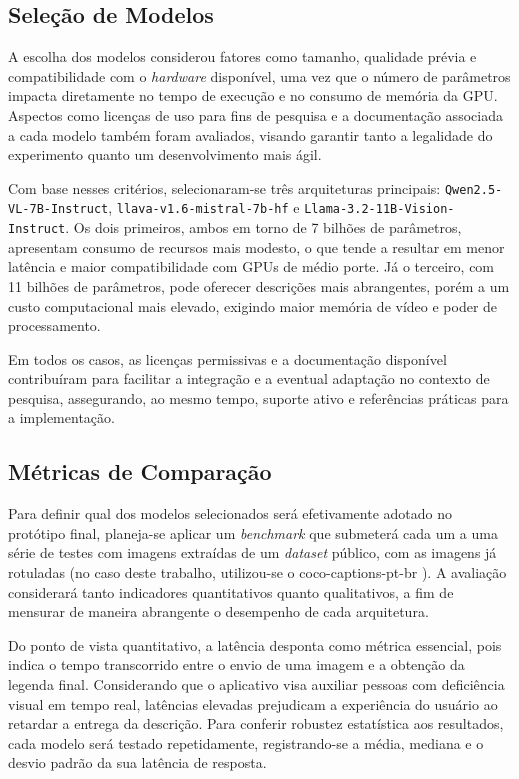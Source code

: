 \subsection{Seleção de Modelos}

A escolha dos modelos considerou fatores como tamanho, qualidade prévia e compatibilidade com o \textit{hardware} disponível, uma vez que o número de parâmetros impacta diretamente no tempo de execução e no consumo de memória da GPU. Aspectos como licenças de uso para fins de pesquisa e a documentação associada a cada modelo também foram avaliados, visando garantir tanto a legalidade do experimento quanto um desenvolvimento mais ágil.

Com base nesses critérios, selecionaram-se três arquiteturas principais: \lstinline{Qwen2.5-VL-7B-Instruct}, \lstinline{llava-v1.6-mistral-7b-hf} e \lstinline{Llama-3.2-11B-Vision-Instruct}. Os dois primeiros, ambos em torno de 7 bilhões de parâmetros, apresentam consumo de recursos mais modesto, o que tende a resultar em menor latência e maior compatibilidade com GPUs de médio porte. Já o terceiro, com 11 bilhões de parâmetros, pode oferecer descrições mais abrangentes, porém a um custo computacional mais elevado, exigindo maior memória de vídeo e poder de processamento. 

Em todos os casos, as licenças permissivas e a documentação disponível contribuíram para facilitar a integração e a eventual adaptação no contexto de pesquisa, assegurando, ao mesmo tempo, suporte ativo e referências práticas para a implementação.

\subsection{Métricas de Comparação}

Para definir qual dos modelos selecionados será efetivamente adotado no protótipo final, planeja-se aplicar um \textit{benchmark} que submeterá cada um a uma série de testes com imagens extraídas de um \textit{dataset} público, com as imagens já rotuladas (no caso deste trabalho, utilizou-se o coco-captions-pt-br \cite{bromonschenkel2024cocopt}). A avaliação considerará tanto indicadores quantitativos quanto qualitativos, a fim de mensurar de maneira abrangente o desempenho de cada arquitetura.

Do ponto de vista quantitativo, a latência desponta como métrica essencial, pois indica o tempo transcorrido entre o envio de uma imagem e a obtenção da legenda final. Considerando que o aplicativo visa auxiliar pessoas com deficiência visual em tempo real, latências elevadas prejudicam a experiência do usuário ao retardar a entrega da descrição. Para conferir robustez estatística aos resultados, cada modelo será testado repetidamente, registrando-se a média, mediana e o desvio padrão da sua latência de resposta.


